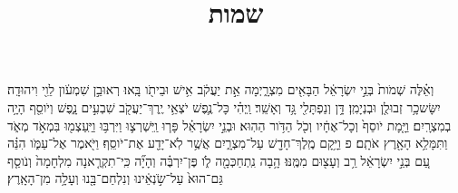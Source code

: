 \documentclass{openreader}
\title{שמות}
\date{}
\begin{document}
\maketitle
\raggedbottom 
\fontsize{16pt}{24pt}\selectfont


וְאֵ֗לֶּה שְׁמֹות֙ בְּנֵ֣י יִשְׂרָאֵ֔ל הַבָּאִ֖ים מִצְרָ֑יְמָה אֵ֣ת יַעֲקֹ֔ב אִ֥ישׁ וּבֵיתֹ֖ו בָּֽאוּ׃ 
רְאוּבֵ֣ן שִׁמְעֹ֔ון לֵוִ֖י וִיהוּדָֽה׃ 
יִשָּׂשכָ֥ר זְבוּלֻ֖ן וּבְנְיָמִֽן׃ 
דָּ֥ן וְנַפְתָּלִ֖י גָּ֥ד וְאָשֵֽׁר׃ 
וַֽיְהִ֗י כָּל־נֶ֛פֶשׁ יֹצְאֵ֥י יֶֽרֶךְ־יַעֲקֹ֖ב שִׁבְעִ֣ים נָ֑פֶשׁ וְיֹוסֵ֖ף הָיָ֥ה בְמִצְרָֽיִם׃ 
וַיָּ֤מָת יֹוסֵף֙ וְכָל־אֶחָ֔יו וְכֹ֖ל הַדֹּ֥ור הַהֽוּא׃ 
וּבְנֵ֣י יִשְׂרָאֵ֗ל פָּר֧וּ וַֽיִּשְׁרְצ֛וּ וַיִּרְבּ֥וּ וַיַּֽעַצְמ֖וּ בִּמְאֹ֣ד מְאֹ֑ד וַתִּמָּלֵ֥א הָאָ֖רֶץ אֹתָֽם׃ פ 
וַיָּ֥קָם מֶֽלֶךְ־חָדָ֖שׁ עַל־מִצְרָ֑יִם אֲשֶׁ֥ר לֹֽא־יָדַ֖ע אֶת־יֹוסֵֽף׃ 
וַיֹּ֖אמֶר אֶל־עַמֹּ֑ו הִנֵּ֗ה עַ֚ם בְּנֵ֣י יִשְׂרָאֵ֔ל רַ֥ב וְעָצ֖וּם מִמֶּֽנּוּ׃ 
הָ֥בָה נִֽתְחַכְּמָ֖ה לֹ֑ו פֶּן־יִרְבֶּ֗ה וְהָיָ֞ה כִּֽי־תִקְרֶ֤אנָה מִלְחָמָה֙ וְנֹוסַ֤ף גַּם־הוּא֙ עַל־שֹׂ֣נְאֵ֔ינוּ וְנִלְחַם־בָּ֖נוּ וְעָלָ֥ה מִן־הָאָֽרֶץ׃ 
\end{document}
